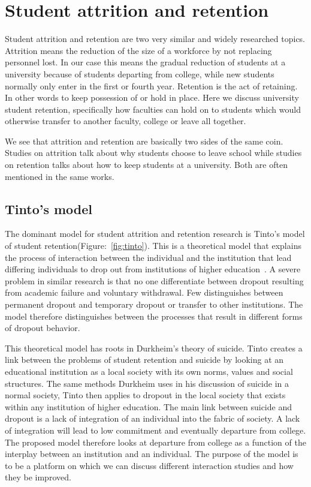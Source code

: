 \chapter{Student attrition and retention}
Student attrition and retention are two very similar and widely researched topics. 
Attrition means the reduction of the size of a workforce by not replacing personnel lost. 
In our case this means the gradual reduction of students at a university because of students departing from college, while new students normally only enter in the first or fourth year. 
Retention is the act of retaining. 
In other words to keep possession of or hold in place. 
Here we discuss university student retention, 
specifically how faculties can hold on to students which would otherwise transfer to another faculty, college or leave all together.

\bigskip\noindent
We see that attrition and retention are basically two sides of the same coin. 
Studies on attrition talk about why students choose to leave school while studies on retention talks about how to keep students at a university. 
Both are often mentioned in the same works. 

\section{Tinto's model}
The dominant model for student attrition and retention research is Tinto's model of student retention(Figure:~\ref{fig:tinto}). 
This is a theoretical model that explains the process of interaction between the individual and the institution that lead differing individuals to drop out from institutions of higher education~\cite{Tinto01031975}. 
A severe problem in similar research is that no one differentiate between dropout resulting from academic failure and voluntary withdrawal. 
Few distinguishes between permanent dropout and temporary dropout or transfer to other institutions. 
The model therefore distinguishes between the processes that result in different forms of dropout behavior.  


\bigskip\noindent
This theoretical model has roots in Durkheim's theory of suicide.
Tinto creates a link between the problems of student retention and suicide by looking at an educational institution as a local society with its own norms, values and social structures.
The same methods Durkheim uses in his discussion of suicide in a normal society, 
Tinto then applies to dropout in the local society that exists within any institution of higher education.
The main link between suicide and dropout is a lack of integration of an individual into the fabric of society.
A lack of integration will lead to low commitment and eventually departure from college.
The proposed model therefore looks at departure from college as a function of the interplay between an institution and an individual.
The purpose of the model is to be a platform on which we can discuss different interaction studies and how they be improved.

